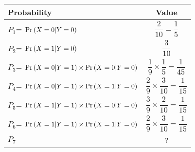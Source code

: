 \begin{tabular}{|l|c|}
	\hline
	\textbf{Probability} & \textbf{Value} \\
	\hline
    $P_1$= $\Pr\left(X=0|Y=0\right)$ & $\dfrac{2}{10}=\dfrac{1}{5}$\\ 
	\hline
	$P_2$= $\Pr\left(X=1|Y=0\right)$ & $\dfrac{3}{10}$\\ 
	\hline
	$P_3$= $\Pr\left(X=0|Y=1\right)\times\Pr\left(X=0|Y=0\right)$ & $\dfrac{1}{9}\times\dfrac{1}{5}=\dfrac{1}{45}$\\ 
	\hline
	$P_4$= $\Pr\left(X=0|Y=1\right)\times\Pr\left(X=1|Y=0\right)$ & $\dfrac{2}{9}\times\dfrac{3}{10}=\dfrac{1}{15}$\\ 
	\hline
    $P_5$= $\Pr\left(X=1|Y=1\right)\times\Pr\left(X=0|Y=0\right)$ & $\dfrac{3}{9}\times\dfrac{2}{10}=\dfrac{1}{15}$\\ 
	\hline
	$P_6$= $\Pr\left(X=1|Y=1\right)\times\Pr\left(X=1|Y=0\right)$ & $\dfrac{2}{9}\times\dfrac{3}{10}=\dfrac{1}{15}$\\ 
	\hline
	$P_7$ & ? \\ 
	\hline
\end{tabular}

